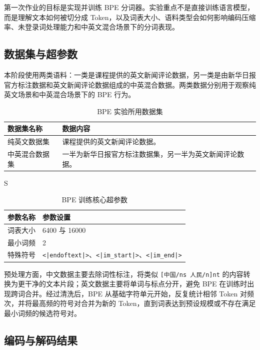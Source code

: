 \documentclass[a4paper,12pt]{ctexart}
\begin{document}
第一次作业的目标是实现并训练 BPE 分词器。实验重点不是直接训练语言模型，而是理解文本如何被切分成 Token，以及词表大小、语料类型会如何影响编码压缩率、未登录词处理能力和中英文混合场景下的分词表现。

\subsection{数据集与超参数}

本阶段使用两类语料：一类是课程提供的英文新闻评论数据，另一类是由新华日报官方标注数据和英文新闻评论数据组成的中英混合数据。两类数据分别用于观察纯英文场景和中英混合场景下的 BPE 行为。

\begin{table}[H]
    \centering
    \begin{tabularx}{\textwidth}{L{0.24\textwidth}Y}
        \toprule
        数据集名称 & 数据内容 \\
        \midrule
        纯英文数据集 & 课程提供的英文新闻评论数据。 \\
        中英混合数据集 & 一半为新华日报官方标注数据集，另一半为英文新闻评论数据。 \\
        \bottomrule
    \end{tabularx}
    \caption{BPE 实验所用数据集}S
\end{table}

\begin{table}[H]
    \centering
    \begin{tabularx}{\textwidth}{L{0.30\textwidth}Y}
        \toprule
        参数名称 & 参数设置 \\
        \midrule
        词表大小 & 6400 与 16000 \\
        最小词频 & 2 \\
        特殊符号 & \texttt{<|endoftext|>}、\texttt{<|im\_start|>}、\texttt{<|im\_end|>} \\
        \bottomrule
    \end{tabularx}
    \caption{BPE 训练核心超参数}
\end{table}

预处理方面，中文数据主要去除词性标注，将类似 \texttt{[中国/ns 人民/n]nt} 的内容转换为更干净的文本片段；英文数据主要将单词与标点分开，避免 BPE 在训练时出现跨词合并。经过清洗后，BPE 从基础字符单元开始，反复统计相邻 Token 对频次，并将最高频的符号对合并为新的 Token，直到词表达到预设规模或不存在满足最小词频的候选符号对。

\subsection{编码与解码结果}
\end{document}
